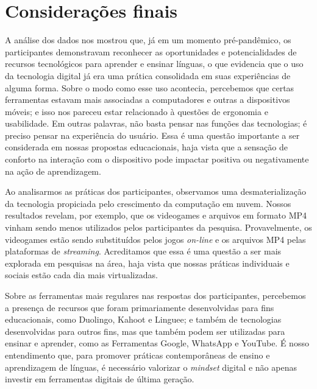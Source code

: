 \documentclass[portuguese]{textolivre}
\begin{document}
\section{Considerações finais}\label{sec-secoes}
A análise dos dados nos mostrou que, já em um momento pré-pandêmico, os participantes demonstravam reconhecer as oportunidades e potencialidades de recursos tecnológicos para aprender e ensinar línguas, o que evidencia que o uso da tecnologia digital já era uma prática consolidada em suas experiências de alguma forma. Sobre o modo como esse uso acontecia, percebemos que certas ferramentas estavam mais associadas a computadores e outras a dispositivos móveis; e isso nos pareceu estar relacionado à questões de ergonomia e usabilidade. Em outras palavras, não basta pensar nas funções das tecnologias; é preciso pensar na experiência do usuário. Essa é uma questão importante a ser considerada em nossas propostas educacionais, haja vista que a sensação de conforto na interação com o dispositivo pode impactar positiva ou negativamente na ação de aprendizagem.

Ao analisarmos as práticas dos participantes, observamos uma desmaterialização da tecnologia propiciada pelo crescimento da computação em nuvem. Nossos resultados revelam, por exemplo, que os videogames e arquivos em formato MP4 vinham sendo menos utilizados pelos participantes da pesquisa. Provavelmente, os videogames estão sendo substituídos pelos jogos \textit{on-line} e os arquivos MP4 pelas plataformas de \textit{streaming}. Acreditamos que essa é uma questão a ser mais explorada em pesquisas na área, haja vista que nossas práticas individuais e sociais estão cada dia mais virtualizadas.

Sobre as ferramentas mais regulares nas respostas dos participantes, percebemos a presença de recursos que foram primariamente desenvolvidas para fins educacionais, como Duolingo, Kahoot e Linguee; e também de tecnologias desenvolvidas para outros fins, mas que também podem ser utilizadas para ensinar e aprender, como as Ferramentas Google, WhatsApp e YouTube. É nosso entendimento que, para promover práticas contemporâneas de ensino e aprendizagem de línguas, é necessário valorizar o \textit{mindset} digital e não apenas investir em ferramentas digitais de última geração.
\end{document}
